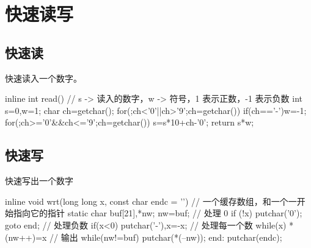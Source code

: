\section{快速读写}
\subsection{快速读}
快速读入一个数字。
\begin{Cpp}
inline int read() {
    // s -> 读入的数字，w -> 符号，1 表示正数，-1 表示负数
    int s=0,w=1;
    char ch=getchar();
    for(;ch<'0'||ch>'9';ch=getchar())
        if(ch=='-')w=-1;
    for(;ch>='0'&&ch<='9';ch=getchar())
        s=s*10+ch-'0';
    return s*w;
}
\end{Cpp}

\subsection{快速写}
快速写出一个数字
\begin{Cpp}
inline void wrt(long long x, const char endc = '\n') {
    // 一个缓存数组，和一个一开始指向它的指针
    static char buf[21],*nw; nw=buf;
    // 处理 0
    if (!x){
        putchar('0');
        goto end;
    }
    // 处理负数
    if(x<0) putchar('-'),x=-x;
    // 处理每一个数
    while(x) *(nw++)=x%
    // 输出
    while(nw!=buf) putchar(*(--nw));
end:
    putchar(endc);
}
\end{Cpp}

